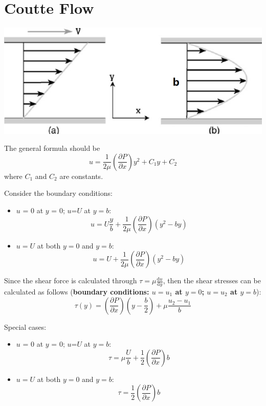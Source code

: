 \documentclass[12pt]{article}
\begin{document}
\section{Coutte Flow}

\includegraphics[width=\textwidth]{figure//coutte_flow.png}

The general formula should be
\begin{equation}
    u = \frac{1}{2\mu} (\frac{\partial P}{\partial x}) y^2 + C_1y + C_2
\end{equation}
where $C_1$ and $C_2$ are constants.

Consider the boundary conditions:
\begin{itemize}
    \item $u$ = 0 at $y$ = 0; $u$=$U$ at $y=b$:
        $$ u = U\frac{y}{b} + \frac{1}{2\mu}(\frac{\partial P}{\partial x})(y^2 - by) $$
    \item $u=U$ at both $y=0$ and $y=b$:
        $$  u = U + \frac{1}{2\mu}(\frac{\partial P}{\partial x})(y^2 - by) $$
\end{itemize}

Since the shear force is calculated through $\tau = \mu \frac{\mathrm{d}u}{\mathrm{d}y}$,
then the shear stresses can be calculated as follows (\textbf{boundary conditions: $u = u_1$ at $y=0$; $u = u_2$ at $y = b$}):
$$ \tau(y) = (\frac{\partial P}{\partial x})(y - \frac{b}{2}) + \mu \frac{u_2 - u_1}{b} $$

Special cases:
\begin{itemize}
    \item $u$ = 0 at $y$ = 0; $u$=$U$ at $y=b$:
        $$ \tau = \mu \frac{U}{b} + \frac{1}{2}(\frac{\partial P}{\partial x})b $$
    \item $u=U$ at both $y=0$ and $y=b$:
        $$  \tau =  \frac{1}{2}(\frac{\partial P}{\partial x})b $$
\end{itemize}
\end{document}
